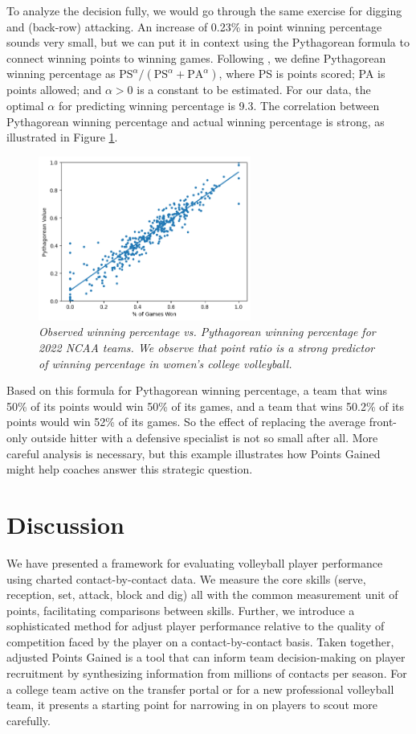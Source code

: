 \documentclass{article}
\begin{document}
To analyze the decision fully, we would go through the same exercise for digging and (back-row) attacking. An increase of 0.23\% in point winning percentage sounds very small, but we can put it in context using the Pythagorean formula to connect winning points to winning games. Following \citet{winston_etal_2022}, we define Pythagorean winning percentage as $\mbox{PS}^\alpha / (\mbox{PS}^\alpha + \mbox{PA}^{\alpha})$, where PS is points scored; PA is points allowed; and $\alpha > 0$ is a constant to be estimated. For our data, the optimal $\alpha$ for predicting winning percentage is 9.3. The correlation between Pythagorean winning percentage and actual winning percentage is strong, as illustrated in Figure \ref{fig:pythag-games-won}.

\begin{figure}
    \centering
    \includegraphics[height=5.4cm]{figures/pythag_games_won.png}
    \caption{\it Observed winning percentage vs. Pythagorean winning percentage for 2022 NCAA teams. We observe that point ratio is a strong predictor of winning percentage in women's college volleyball.}
    \label{fig:pythag-games-won}
\end{figure}

Based on this formula for Pythagorean winning percentage, a team that wins 50\% of its points would win 50\% of its games, and a team that wins 50.2\% of its points would win 52\% of its games. So the effect of replacing the average front-only outside hitter with a defensive specialist is not so small after all. More careful analysis is necessary, but this example illustrates how Points Gained might help coaches answer this strategic question.


\section{Discussion}

We have presented a framework for evaluating volleyball player performance using charted contact-by-contact data. We measure the core skills (serve, reception, set, attack, block and dig) all with the common measurement unit of points, facilitating comparisons between skills. Further, we introduce a sophisticated method for adjust player performance relative to the quality of competition faced by the player on a contact-by-contact basis. Taken together, adjusted Points Gained is a tool that can inform team decision-making on player recruitment by synthesizing information from millions of contacts per season. For a college team active on the transfer portal or for a new professional volleyball team, it presents a starting point for narrowing in on players to scout more carefully.
\end{document}
